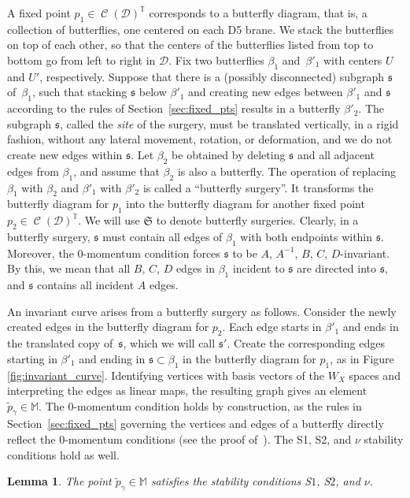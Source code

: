 \documentclass[11pt]{article}
\numberwithin{equation}{section}
\newtheorem{Lemma}[Theorem]{Lemma}
\newcommand{\brane}{\mathcal D}
\newcommand{\torus}{\mathbb T}
\newcommand{\MM}{\mathbb M}
\newcommand{\but}{\beta}
\newcommand{\site}{\mathfrak s}
\newcommand{\surgery}{\mathfrak S}
\DeclareMathOperator{\bowvar}{\mathcal C}
\begin{document}
A fixed point $p_1\in \bowvar(\brane)^\torus$ corresponds to a butterfly diagram, that is, a collection of butterflies, one centered on each D5 brane. We stack the butterflies on top of each other, so that the centers of the butterflies listed from top to bottom go from left to right in $\brane$. Fix two butterflies $\but_1$ and~$\but'_1$ with centers $U$ and $U'$, respectively. Suppose that there is a (possibly disconnected) subgraph $\site$ of~$\but_1$, such that stacking $\site$ below $\but'_1$ and creating new edges between $\but'_1$ and $\site$ according to the rules of Section~\ref{sec:fixed_pts} results in a butterfly $\but'_2$. The subgraph $\site$, called the \emph{site} of the surgery, must be translated vertically, in a rigid fashion, without any lateral movement, rotation, or deformation, and we do not create new edges within $\site$. Let $\but_2$ be obtained by deleting $\site$ and all adjacent edges from $\but_1$, and assume that $\but_2$ is also a butterfly. The operation of replacing $\but_1$ with $\but_2$ and $\but'_1$ with $\but'_2$ is called a ``butterfly surgery''. It transforms the butterfly diagram for $p_1$ into the butterfly diagram for another fixed point $p_2\in \bowvar(\brane)^\torus$. We will use $\surgery$ to denote butterfly surgeries. Clearly, in a butterfly surgery, $\site$ must contain all edges of $\but_1$ with both endpoints within $\site$. Moreover, the 0-momentum condition forces $\site$ to be $A$, $A^{-1}$, $B$, $C$, $D$-invariant. By this, we mean that all $B$, $C$, $D$ edges in $\but_1$ incident to $\site$ are directed into $\site$, and $\site$ contains all incident $A$ edges.

An invariant curve arises from a butterfly surgery as follows. Consider the newly created edges in the butterfly diagram for $p_2$. Each edge starts in $\but'_1$ and ends in the translated copy of~$\site$, which we will call $\site'$. Create the corresponding edges starting in $\but'_1$ and ending in $\site\subset\but_1$ in the butterfly diagram for $p_1$, as in Figure \ref{fig:invariant_curve}. Identifying vertices with basis vectors of the $W_X$ spaces and interpreting the edges as linear maps, the resulting graph gives an element~${\tilde{p}_\gamma \in \MM}$. The 0-momentum condition holds by construction, as the rules in Section~\ref{sec:fixed_pts} governing the vertices and edges of a butterfly directly reflect the 0-momentum conditions (see the proof of~\cite[Theorem~4.8]{RS}). The S1, S2, and $\nu$ stability conditions hold as well.

\begin{Lemma} \label{lemma:type1_curve}
The point $\tilde{p}_\gamma \in \MM$ satisfies the stability conditions S$1$, S$2$, and $\nu$.
\end{Lemma}
\end{document}
